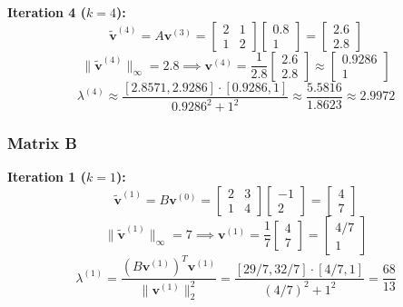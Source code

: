 \documentclass{article}
\newcommand{\0}{{\mathbf{0}}} %
\begin{document}
\textbf{Iteration 4 ($k=4$):}
\[
\tilde{\mathbf{v}}^{(4)} = A \mathbf{v}^{(3)} =
\begin{bmatrix} 2 & 1 \\ 1 & 2
\end{bmatrix}
\begin{bmatrix} 0.8 \\ 1
\end{bmatrix} =
\begin{bmatrix} 2.6 \\ 2.8
\end{bmatrix}
\]
\[
\|\tilde{\mathbf{v}}^{(4)}\|_\infty = 2.8 \implies \mathbf{v}^{(4)} = \frac{1}{2.8}
\begin{bmatrix} 2.6 \\ 2.8
\end{bmatrix} \approx
\begin{bmatrix} 0.9286 \\ 1
\end{bmatrix}
\]
\[
\lambda^{(4)} \approx \frac{[2.8571, 2.9286] \cdot [0.9286, 1]}{0.9286^2 + 1^2} \approx \frac{5.5816}{1.8623} \approx \mathbf{2.9972}
\]

\subsubsection*{Matrix B}

\textbf{Iteration 1 ($k=1$):}
\[
\tilde{\mathbf{v}}^{(1)} = B \mathbf{v}^{(0)} =
\begin{bmatrix} 2 & 3 \\ 1 & 4
\end{bmatrix}
\begin{bmatrix} -1 \\ 2
\end{bmatrix} =
\begin{bmatrix} 4 \\ 7
\end{bmatrix}
\]
\[
\|\tilde{\mathbf{v}}^{(1)}\|_\infty = 7 \implies \mathbf{v}^{(1)} = \frac{1}{7}
\begin{bmatrix} 4 \\ 7
\end{bmatrix} =
\begin{bmatrix} 4/7 \\ 1
\end{bmatrix}
\]
\[
\lambda^{(1)} = \frac{(B\mathbf{v}^{(1)})^T \mathbf{v}^{(1)}}{\|\mathbf{v}^{(1)}\|_2^2} = \frac{[29/7, 32/7] \cdot [4/7, 1]}{(4/7)^2 + 1^2} = \frac{68}{13}
\]
\end{document}

